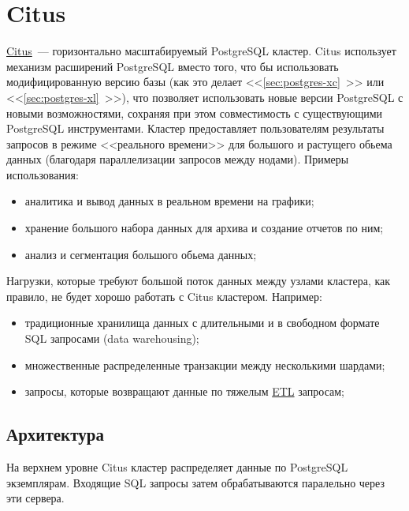 \section{Citus}
\label{sec:citus}

\href{https://www.citusdata.com/}{Citus}~--- горизонтально масштабируемый PostgreSQL кластер. Citus использует механизм расширений PostgreSQL вместо того, что бы использовать модифицированную версию базы (как это делает <<\ref{sec:postgres-xc}~>> или <<\ref{sec:postgres-xl}~>>), что позволяет использовать новые версии PostgreSQL с новыми возможностями, сохраняя при этом совместимость с существующими PostgreSQL инструментами. Кластер предоставляет пользователям результаты запросов в режиме <<реального времени>> для большого и растущего обьема данных (благодаря параллелизации запросов между нодами). Примеры использования:

\begin{itemize}
  \item аналитика и вывод данных в реальном времени на графики;
  \item хранение большого набора данных для архива и создание отчетов по ним;
  \item анализ и сегментация большого обьема данных;
\end{itemize}

Нагрузки, которые требуют большой поток данных между узлами кластера, как правило, не будет хорошо работать с Citus кластером. Например:

\begin{itemize}
  \item традиционные хранилища данных с длительными и в свободном формате SQL запросами (data warehousing);
  \item множественные распределенные транзакции между несколькими шардами;
  \item запросы, которые возвращают данные по тяжелым \href{https://ru.wikipedia.org/wiki/ETL}{ETL} запросам;
\end{itemize}



\subsection{Архитектура}

На верхнем уровне Citus кластер распределяет данные по PostgreSQL экземплярам. Входящие SQL запросы затем обрабатываются паралельно через эти сервера.

